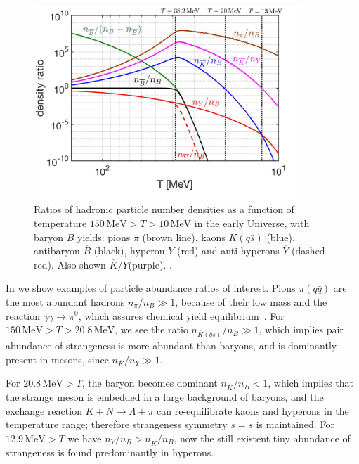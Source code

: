 \begin{figure}  
\centerline{
\includegraphics[width=0.9\textwidth]{./plots/Meson_Baryon_density_ratio_C.jpg}}
\caption{Ratios of hadronic particle number densities as a function of temperature $150\,\mathrm{MeV}> T>10\,\mathrm{MeV}$ in the early Universe, with baryon $B$ yields: pions $\pi$ (brown line), kaons $K( q\bar s)$ (blue), antibaryon $\overline B$ (black), hyperon $Y$ (red) and anti-hyperons $\overline Y$ (dashed red). Also shown $\overline K/Y$(purple). . }
\label{EquilibPartRatiosFig} 
\end{figure}

In  we show examples of particle abundance ratios of interest. %
Pions $\pi(q\bar q)$ are the most abundant hadrons $n_\pi/n_B\gg1$, because of their low mass and the reaction $\gamma\gamma\rightarrow\pi^0$, which assures chemical yield equilibrium~\cite{Kuznetsova:2008jt}. For $150\,\mathrm{MeV}>T>20.8\,\mathrm{MeV}$, we see the ratio $n_{{\overline K}(\bar q s)}/n_B\gg1$, which implies pair abundance of strangeness is more abundant than baryons, and is dominantly present in mesons, since $n_{\overline K}/n_Y\gg1$. 

For $20.8\,\mathrm{MeV}>T$, the baryon becomes dominant $n_{\overline K}/n_B<1$, which implies that the strange meson is embedded in a large background of baryons, and the exchange reaction $\overline{K}+N\rightarrow \Lambda+\pi$ can re-equilibrate kaons and hyperons in the temperature range; therefore strangeness symmetry $s=\bar s$ is maintained. For $12.9\,\mathrm{MeV}>T$ we have $n_Y/n_B>n_{\overline K}/n_B$, now the still existent tiny abundance of strangeness is found predominantly in hyperons.

